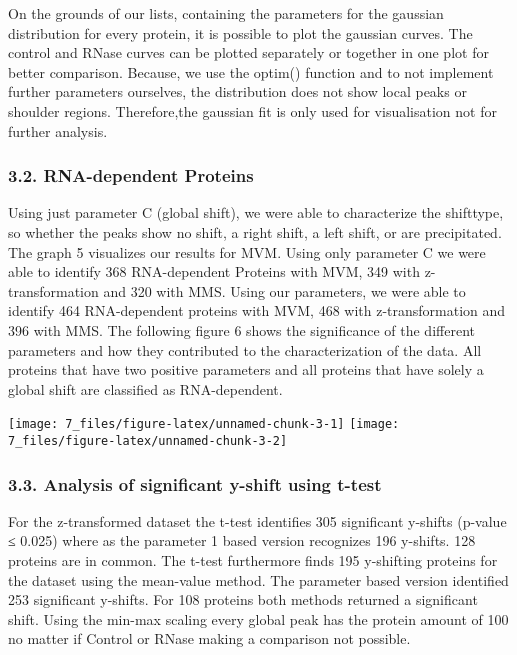 \documentclass[
  12pt,
]{article}
\begin{document}
On the grounds of our lists, containing the parameters for the gaussian
distribution for every protein, it is possible to plot the gaussian
curves. The control and RNase curves can be plotted separately or
together in one plot for better comparison. Because, we use the optim()
function and to not implement further parameters ourselves, the
distribution does not show local peaks or shoulder regions.
Therefore,the gaussian fit is only used for visualisation not for
further analysis.

\hypertarget{rna-dependent-proteins}{%
\subsubsection{3.2. RNA-dependent
Proteins}\label{rna-dependent-proteins}}

Using just parameter C (global shift), we were able to characterize the
shifttype, so whether the peaks show no shift, a right shift, a left
shift, or are precipitated. The graph 5 visualizes our results for MVM.
Using only parameter C we were able to identify 368 RNA-dependent
Proteins with MVM, 349 with z-transformation and 320 with MMS. Using our
parameters, we were able to identify 464 RNA-dependent proteins with
MVM, 468 with z-transformation and 396 with MMS. The following figure 6
shows the significance of the different parameters and how they
contributed to the characterization of the data. All proteins that have
two positive parameters and all proteins that have solely a global shift
are classified as RNA-dependent.

\texttt{[image: 7\_files/figure-latex/unnamed-chunk-3-1]}
\texttt{[image: 7\_files/figure-latex/unnamed-chunk-3-2]}

\hypertarget{analysis-of-significant-y-shift-using-t-test-1}{%
\subsubsection{3.3. Analysis of significant y-shift using
t-test}\label{analysis-of-significant-y-shift-using-t-test-1}}

For the z-transformed dataset the t-test identifies 305 significant
y-shifts (p-value ≤ 0.025) where as the parameter 1 based version
recognizes 196 y-shifts. 128 proteins are in common. The t-test
furthermore finds 195 y-shifting proteins for the dataset using the
mean-value method. The parameter based version identified 253
significant y-shifts. For 108 proteins both methods returned a
significant shift. Using the min-max scaling every global peak has the
protein amount of 100 no matter if Control or RNase making a comparison
not possible.
\end{document}
